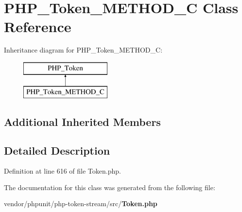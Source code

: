 \section{P\+H\+P\+\_\+\+Token\+\_\+\+M\+E\+T\+H\+O\+D\+\_\+\+C Class Reference}
\label{class_p_h_p___token___m_e_t_h_o_d___c}
Inheritance diagram for P\+H\+P\+\_\+\+Token\+\_\+\+M\+E\+T\+H\+O\+D\+\_\+\+C\+:\begin{figure}[H]
\begin{center}
\leavevmode
\includegraphics[height=2.000000cm]{class_p_h_p___token___m_e_t_h_o_d___c}
\end{center}
\end{figure}
\subsection*{Additional Inherited Members}


\subsection{Detailed Description}


Definition at line 616 of file Token.\+php.



The documentation for this class was generated from the following file\+:\begin{DoxyCompactItemize}
\item 
vendor/phpunit/php-\/token-\/stream/src/{\bf Token.\+php}\end{DoxyCompactItemize}
